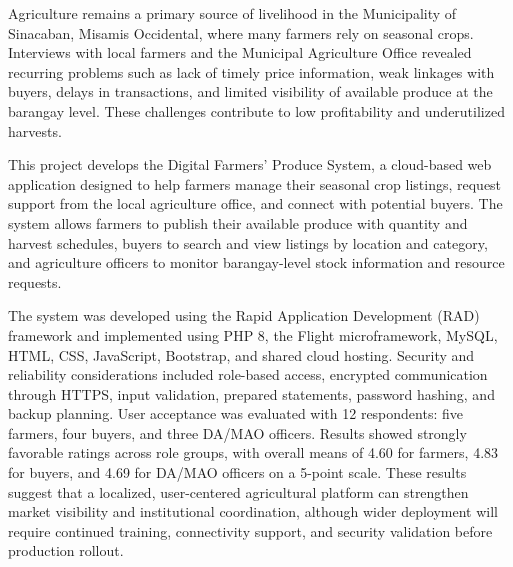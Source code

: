 
\begin{abstractwithpageno}	
Agriculture remains a primary source of livelihood in the Municipality of Sinacaban, Misamis Occidental, where many farmers rely on seasonal crops. Interviews with local farmers and the Municipal Agriculture Office revealed recurring problems such as lack of timely price information, weak linkages with buyers, delays in transactions, and limited visibility of available produce at the barangay level. These challenges contribute to low profitability and underutilized harvests.

This project develops the Digital Farmers’ Produce System, a cloud-based web application designed to help farmers manage their seasonal crop listings, request support from the local agriculture office, and connect with potential buyers. The system allows farmers to publish their available produce with quantity and harvest schedules, buyers to search and view listings by location and category, and agriculture officers to monitor barangay-level stock information and resource requests.

The system was developed using the Rapid Application Development (RAD) framework and implemented using PHP 8, the Flight microframework, MySQL, HTML, CSS, JavaScript, Bootstrap, and shared cloud hosting. Security and reliability considerations included role-based access, encrypted communication through HTTPS, input validation, prepared statements, password hashing, and backup planning. User acceptance was evaluated with 12 respondents: five farmers, four buyers, and three DA/MAO officers. Results showed strongly favorable ratings across role groups, with overall means of 4.60 for farmers, 4.83 for buyers, and 4.69 for DA/MAO officers on a 5-point scale. These results suggest that a localized, user-centered agricultural platform can strengthen market visibility and institutional coordination, although wider deployment will require continued training, connectivity support, and security validation before production rollout.
\end{abstractwithpageno}